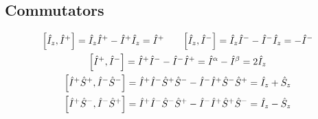 \begin{appendixtext}
\subsection{Commutators}
\begin{equation*}
\begin{gathered}
\comm{\hat{I}_z}{\hat{I}^+} = \hat{I}_z \hat{I}^+ - \hat{I}^+ \hat{I}_z = \hat{I}^+ \hspace{20pt}
\comm{\hat{I}_z}{\hat{I}^-} = \hat{I}_z \hat{I}^- - \hat{I}^- \hat{I}_z = -\hat{I}^- \\
\comm{\hat{I}^+}{\hat{I}^-} = \hat{I}^+ \hat{I}^- - \hat{I}^- \hat{I}^+ = \hat{I}^{\alpha} - \hat{I}^{\beta} = 2 \hat{I}_z \\
\comm{\hat{I}^+ \hat{S}^+}{\hat{I}^- \hat{S}^-} = \hat{I}^+ \hat{I}^- \hat{S}^+ \hat{S}^- - \hat{I}^- \hat{I}^+ \hat{S}^- \hat{S}^+ = \hat{I}_z + \hat{S}_z \\
\comm{\hat{I}^+ \hat{S}^-}{\hat{I}^- \hat{S}^+} = \hat{I}^+ \hat{I}^- \hat{S}^- \hat{S}^+ - \hat{I}^- \hat{I}^+ \hat{S}^+ \hat{S}^- = \hat{I}_z - \hat{S}_z
\end{gathered}
\end{equation*}

\end{appendixtext}
